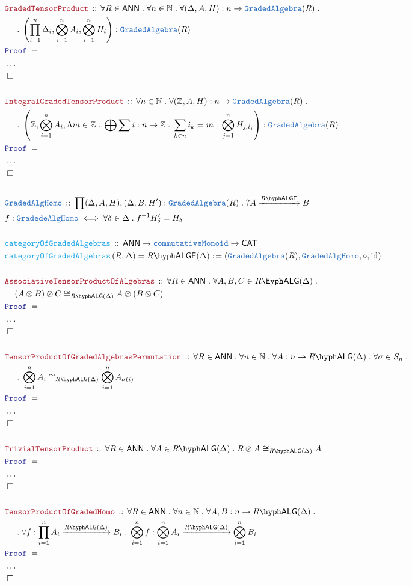 \documentclass[12pt]{scrartcl}%
\newcommand{\TYPE}[1]{\textcolor{NavyBlue}{\mathtt{#1}}}%
\newcommand{\FUNC}[1]{\textcolor{Cerulean}{\mathtt{#1}}}%
\newcommand{\LOGIC}[1]{\textcolor{Blue}{\mathtt{#1}}}%
\newcommand{\THM}[1]{\textcolor{Maroon}{\mathtt{#1}}}%
\renewcommand{\.}{\; . \;} %
\newcommand{\de}{: \kern 0.1pc =} %
\newcommand{\Act}[1]{\left( #1 \right)} %
\newcommand{\Theorem}[2]{& \THM{#1} \, :: \, #2 \\ & \Proof = \\ } %
\newcommand{\DeclareType}[2]{& \TYPE{#1} \, :: \, #2 \\}%
\newcommand{\DefineType}[3]{& #1 : \TYPE{#2} \iff #3 \\}%
\newcommand{\DeclareFunc}[2]{& \FUNC{#1} \, :: \, #2 \\}%
\newcommand{\DefineNamedFunc}[4]{&  \FUNC{#1}\Act{#2} = #3 \de #4 \\}%
\newcommand{\NewLine}{\\ & \kern 1pc}%
\newcommand{\Page}[1]{ \begin{align*} #1 \end{align*}  }%
\newcommand{\NoProof}{ & \ldots \\ \EndProof}%
\newcommand{\Int}{\mathbb{Z}}%
\newcommand{\Nat}{\mathbb{N}}%
\DeclareMathOperator*{\id}{id}%
\newcommand{\QED}{\; \square} %
\newcommand{\EndProof}{& \QED \\} %
\newcommand{\Proof}{\LOGIC{Proof} \; } %
\newcommand{\Arrow}[1]{\xrightarrow{#1}}%
\newcommand{\CAT}{\mathsf{CAT}} %
\newcommand{\ANN}{\mathsf{ANN}} %
\newcommand{\LALG}[1]{#1\hyph\mathsf{ALG}}%
\newcommand{\LALGE}[1]{#1\hyph\mathsf{ALGE}}%
\begin{document}
\Page{
	\Theorem{GradedTensorProduct}{\forall R \in \ANN \. \forall n \in \Nat \. \forall (\Delta,A,H) : n \to \TYPE{GradedAlgebra}(R) \.
		\NewLine \. \left( \prod^n_{i=1} \Delta_i,\bigotimes^n_{i=1} A_i, \bigotimes^n_{i=1} H_i\right) : \TYPE{GradedAlgebra}(R) } 
	\NoProof
	\\
	\Theorem{IntegralGradedTensorProduct}{ \forall n \in \Nat \. \forall (\Int,A,H) : n \to \TYPE{GradedAlgebra}(R) \. \NewLine \.  
		\left( \Int, \bigotimes^n_{i=1} A_i, \Lambda m \in \Int \. \bigoplus \sum i : n \to \Int \. \sum_{k \in n} i_k = m \. \bigotimes^n_{j=1} H_{j,i_j}   \right)
		: \TYPE{GradedAlgebra}(R)
	}
	\NoProof
	\\
	\DeclareType{GradedAlgHomo}{\prod (\Delta,A,H),(\Delta,B,H') : \TYPE{GradedAlgebra}(R) \. ? A \Arrow{\LALGE{R}} B}
	\DefineType{f}{GradedeAlgHomo}{\forall \delta \in \Delta \. f^{-1} H'_\delta = H_\delta}
	\\
	\DeclareFunc{categoryOfGradedAlgebras}{\ANN \to \TYPE{commutativeMonoid} \to \CAT}
	\DefineNamedFunc{categoryOfGradedAlgebras}{R,\Delta}{\LALGE{R}(\Delta)}{(\TYPE{GradedAlgebra}(R), \TYPE{GradedAlgHomo},\circ,\id)}
	\\
	\Theorem{AssociativeTensorProductOfAlgebras}{\forall R \in \ANN \. \forall A,B,C \in \LALG{R}(\Delta) \. \NewLine (A \otimes B) \otimes C \cong_{\LALG{R}(\Delta)} A \otimes (B \otimes C)}
	\NoProof
	\\
	\Theorem{TensorProductOfGradedAlgebrasPermutation}{\forall R \in \ANN \.  \forall n \in \Nat \. \forall A : n \to \LALG{R}(\Delta) \. \forall \sigma \in S_n \. 
		\NewLine \.
		\bigotimes^n_{i=1} A_i \cong_{\LALG{R}(\Delta)} \bigotimes^n_{i=1} A_{\sigma(i)}
	}
	\NoProof
	\\
	\Theorem{TrivialTensorProduct}{\forall R \in \ANN \. \forall A \in \LALG{R}(\Delta) \. R \otimes A \cong_{\LALG{R}(\Delta)} A}
	\NoProof
	\\
	\Theorem{TensorProductOfGradedHomo}{ 
		\forall R \in \ANN \. 
		\forall n \in \Nat \. 
		\forall A,B : n \to \LALG{R}(\Delta) \. \NewLine \.  
		\forall f : \prod^n_{i=1} A_i \Arrow{\LALG{R}(\Delta)} B_i \.  
		\bigotimes^n_{i=1} f : \bigotimes^n_{i=1} A_i \Arrow{\LALG{R}(\Delta)} \bigotimes^n_{i=1} B_i  	
	}
	\NoProof
}
\end{document}
